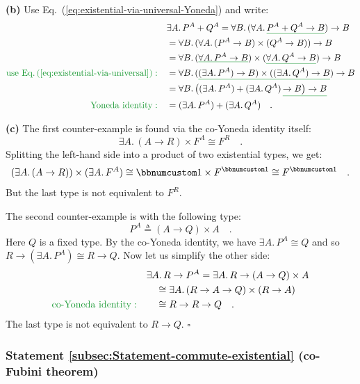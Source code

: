 \textbf{(b)} Use Eq.~(\ref{eq:existential-via-universal-Yoneda})
and write:
\begin{align*}
 & \exists A.\,P^{A}+Q^{A}=\forall B.\,(\forall A.\,\gunderline{P^{A}+Q^{A}\rightarrow B})\rightarrow B\\
 & =\forall B.\,(\forall A.\,(P^{A}\rightarrow B)\times(Q^{A}\rightarrow B))\rightarrow B\\
 & =\forall B.\,(\gunderline{\forall A.\,P^{A}\rightarrow B})\times(\gunderline{\forall A.\,Q^{A}\rightarrow B})\rightarrow B\\
{\color{greenunder}\text{use Eq.\,(\ref{eq:existential-via-universal})}:}\quad & =\forall B.\,(\gunderline{(\exists A.\,P^{A})\rightarrow B)\times((\exists A.\,Q^{A})\rightarrow B})\rightarrow B\\
 & =\forall B.\,\big((\exists A.\,P^{A})+(\exists A.\,Q^{A})\,\gunderline{\rightarrow B\big)\rightarrow B}\\
{\color{greenunder}\text{Yoneda identity}:}\quad & =(\exists A.\,P^{A})+(\exists A.\,Q^{A})\quad.
\end{align*}

\textbf{(c)} The first counter-example is found via the co-Yoneda
identity itself:
\[
\exists A.\,(A\rightarrow R)\times F^{A}\cong F^{R}\quad.
\]
Splitting the left-hand side into a product of two existential types,
we get:
\[
(\exists A.\,(A\rightarrow R))\times(\exists A.\,F^{A})\cong\bbnum 1\times F^{\bbnum 1}\cong F^{\bbnum 1}\quad.
\]
But the last type is not equivalent to $F^{R}$.

The second counter-example is with the following type:
\[
P^{A}\triangleq(A\rightarrow Q)\times A\quad.
\]
Here $Q$ is a fixed type. By the co-Yoneda identity, we have $\exists A.\,P^{A}\cong Q$
and so $R\rightarrow(\exists A.\,P^{A})\cong R\rightarrow Q$. Now
let us simplify the other side: 
\begin{align*}
 & \exists A.\,R\rightarrow P^{A}=\exists A.\,R\rightarrow(A\rightarrow Q)\times A\\
 & \quad\cong\exists A.\,(R\rightarrow A\rightarrow Q)\times(R\rightarrow A)\\
{\color{greenunder}\text{co-Yoneda identity}:}\quad & \quad\cong R\rightarrow R\rightarrow Q\quad.
\end{align*}
The last type is not equivalent to $R\rightarrow Q$. $\square$

\subsubsection{Statement \label{subsec:Statement-commute-existential}\ref{subsec:Statement-commute-existential}
(co-Fubini theorem)}

